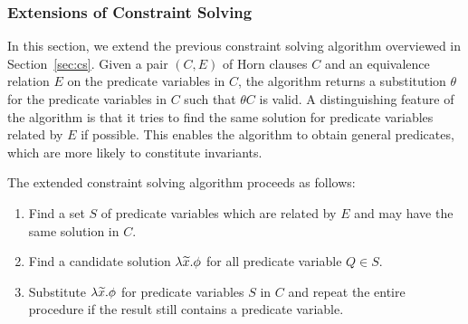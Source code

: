 \subsubsection{Extensions of Constraint Solving}
\label{sec:extcs}

In this section, we extend the previous constraint solving algorithm
overviewed in Section~\ref{sec:cs}.  Given a pair \((C,E)\) of Horn
clauses \(C\) and an equivalence relation \(E\) on the predicate
variables in \(C\), the algorithm returns a substitution \(\theta\) for
the predicate variables in \(C\) such that \(\theta C\) is valid.  A
distinguishing feature of the algorithm is that it tries to find the
same solution for predicate variables related by \(E\) if possible.
This enables the algorithm to obtain general predicates, which are more
likely to constitute invariants. %


The extended constraint solving algorithm proceeds as follows:
\vspace{-10pt}
\begin{enumerate}
\item Find a set \(S\) of predicate variables which are related by \(E\)
and may have the same solution in \(C\).
\item Find a candidate solution \(\lambda \widetilde{x}.\phi\) for all
predicate variable \(Q \in S\).
\item Substitute \(\lambda \widetilde{x}.\phi\) for predicate variables \(S\)
in \(C\) and repeat the entire procedure if the result still contains a
predicate variable.
\end{enumerate}
\vspace{-10pt}

